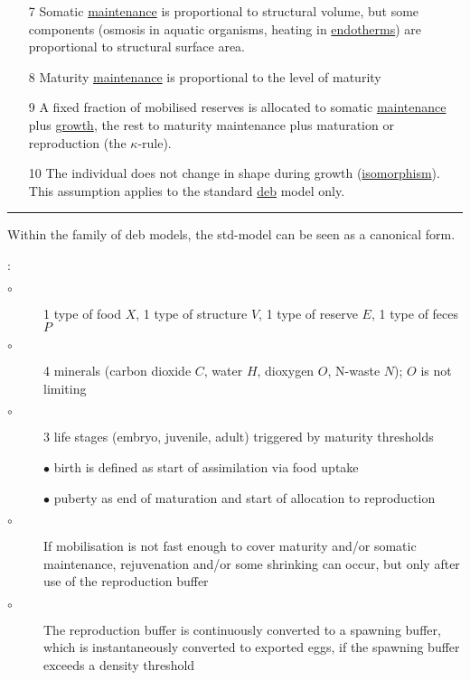 \begin{table}[tb]
\begin{itemize}
\item[7] Somatic \hyperref[glos:maintenance]{maintenance} is proportional to structural volume, but some components (osmosis in aquatic organisms, heating in \hyperref[glos:endotherm]{endotherms}) are proportional to structural surface area.
  
\item[8] Maturity \hyperref[glos:maintenance]{maintenance} is proportional to the level of maturity

\item[9] A fixed fraction of mobilised reserves is allocated to somatic \hyperref[glos:maintenance]{maintenance} plus \hyperref[glos:growth]{growth}, the rest to maturity maintenance plus maturation or reproduction (the $\kappa$-rule).
  
\item[10] The individual does not change in shape during growth (\hyperref[glos:isomorph]{isomorphism}).
  This assumption applies to the standard \hyperref[glos:DEB]{\sc deb} model only.

\end{itemize}
  \rule{16cm}{.1mm}
\end{table}


Within the family of {\sc deb} models, the std-model can be seen as a canonical form.

\vspace{5mm}: {\small
\begin{description}
  \item[$\circ$] 1 type of food $X$, 1 type of structure $V$, 1 type of reserve $E$, 1 type of feces $P$ 
	
	\item[$\circ$] 4 minerals (carbon dioxide $C$, water $H$, dioxygen $O$, N-waste $N$); $O$ is not limiting 
	
  \item[$\circ$] 3 life stages (embryo, juvenile, adult) triggered by maturity thresholds
	
	  \subitem $\bullet$ birth is defined as start of assimilation via food uptake 
		
		\subitem $\bullet$ puberty as end of maturation and start of allocation to reproduction
		
	\item[$\circ$] If mobilisation is not fast enough to cover maturity and/or somatic maintenance,
	  rejuvenation and/or some shrinking can occur, but only after use of the reproduction buffer
		
	\item[$\circ$] The reproduction buffer is continuously converted to a spawning buffer, which is instantaneously converted to exported eggs,
	  if the spawning buffer exceeds a density threshold
\end{description}}

